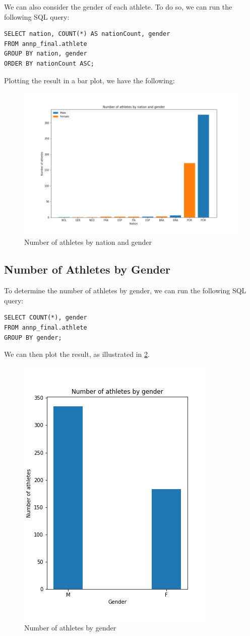We can also consider the gender of each athlete.
To do so, we can run the following SQL query:

\begin{verbatim}
SELECT nation, COUNT(*) AS nationCount, gender
FROM annp_final.athlete
GROUP BY nation, gender
ORDER BY nationCount ASC;
\end{verbatim}

Plotting the result in a bar plot, we have the following:

\begin{figure}[H]
    \centering
    \includegraphics[width=.8\textwidth]{img/athletesbynationgender}
    \caption{Number of athletes by nation and gender}
    \label{fig:athletesbynationgender}
\end{figure}

\subsection{Number of Athletes by Gender}\label{subsec:number-of-athletes-by-gender}

To determine the number of athletes by gender, we can run the following SQL query:

\begin{verbatim}
SELECT COUNT(*), gender
FROM annp_final.athlete
GROUP BY gender;
\end{verbatim}

We can then plot the result, as illustrated in \cref{fig:athletesbygender}.

\begin{figure}[H]
    \centering
    \includegraphics[width=.35\textwidth]{img/athletesbygender}
    \caption{Number of athletes by gender}
    \label{fig:athletesbygender}
\end{figure}

